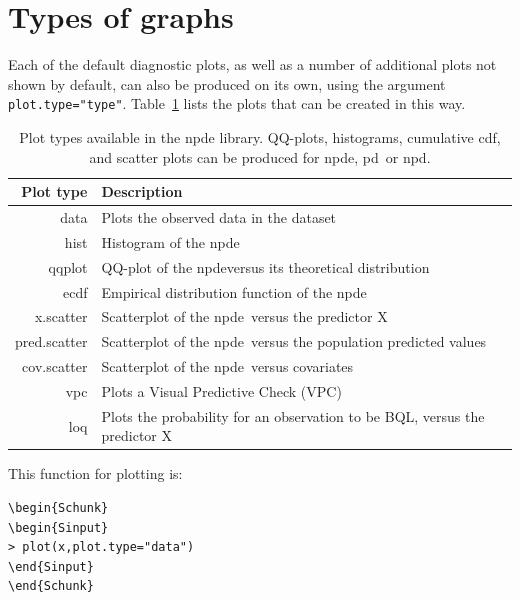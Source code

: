 \documentclass{report}
\def\npde{{\rm npde}}
\def\npd{{\rm npd}}
\def\pd{{\rm pd}}
\begin{document}
\section{Types of graphs}

\hskip 18pt Each of the default diagnostic plots, as well as a number of additional plots not shown by default, can also be produced on its own, using the argument \verb+plot.type="type"+. Table~\ref{tab:plottypes} lists the plots that can be created in this way. 

\begin{table}[!h]
\begin{center}
\begin{tabular} {| r p{10cm} |}
\hline {\bf Plot type} & {\bf Description} \\
\hline
data & Plots the observed data in the dataset \\
hist & Histogram of the \npde \\
qqplot & QQ-plot of the \npde versus its theoretical distribution  \\
ecdf & Empirical distribution function of the \npde\\
x.scatter & Scatterplot of the \npde~versus the predictor X \\
pred.scatter & Scatterplot of the \npde~versus the population predicted values \\
cov.scatter & Scatterplot of the \npde~versus covariates \\
vpc & Plots a Visual Predictive Check (VPC) \\
loq & Plots the probability for an observation to be BQL, versus the predictor X \\
\hline
\end{tabular}
\end{center}
\caption{Plot types available in the {\sf npde} library. QQ-plots, histograms, cumulative cdf, and scatter plots can be produced for \npde, \pd~or \npd.} \label{tab:plottypes}
\end{table}

\noindent This function for plotting is:
\begin{lstlisting}[linerange=\\begin\{Sinput\}-\\end\{Sinput\}, includerangemarker=false]
\begin{Schunk}
\begin{Sinput}
> plot(x,plot.type="data")
\end{Sinput}
\end{Schunk}
\end{lstlisting} 
\end{document}
